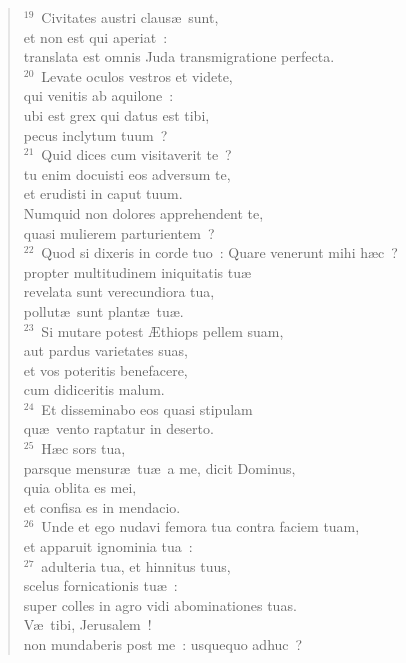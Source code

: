 \begin{flushleft}
\begin{verse}
${}^{19}$~Civitates austri claus\ae\ sunt,\\ et non est qui aperiat~:\\ translata est omnis Juda transmigratione perfecta.\\
${}^{20}$~Levate oculos vestros et videte,\\ qui venitis ab aquilone~:\\ ubi est grex qui datus est tibi,\\ pecus inclytum tuum~?\\
${}^{21}$~Quid dices cum visitaverit te~?\\ tu enim docuisti eos adversum te,\\ et erudisti in caput tuum.\\ Numquid non dolores apprehendent te,\\ quasi mulierem parturientem~?\\
${}^{22}$~Quod si dixeris in corde tuo~: Quare venerunt mihi h\ae c~?\\ propter multitudinem iniquitatis tu\ae \\ revelata sunt verecundiora tua,\\ pollut\ae\ sunt plant\ae\ tu\ae .\\
${}^{23}$~Si mutare potest \AE thiops pellem suam,\\ aut pardus varietates suas,\\ et vos poteritis benefacere,\\ cum didiceritis malum.\\
${}^{24}$~Et disseminabo eos quasi stipulam\\ qu\ae\ vento raptatur in deserto.\\
${}^{25}$~H\ae c sors tua,\\ parsque mensur\ae\ tu\ae\ a me, dicit Dominus,\\ quia oblita es mei,\\ et confisa es in mendacio.\\
${}^{26}$~Unde et ego nudavi femora tua contra faciem tuam,\\ et apparuit ignominia tua~:\\
${}^{27}$~adulteria tua, et hinnitus tuus,\\ scelus fornicationis tu\ae~:\\ super colles in agro vidi abominationes tuas.\\ V\ae\ tibi, Jerusalem~!\\ non mundaberis post me~: usquequo adhuc~?\end{verse}\end{flushleft}


